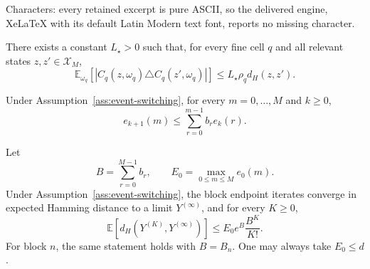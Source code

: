 \documentclass[10pt,a4paper]{amsart}
\begin{document}
Characters: every retained excerpt is pure ASCII, so the delivered engine, XeLaTeX with its default Latin Modern text font, reports no missing character.
\begin{assumption}
\label{ass:event-switching}
There exists a constant $L_\star>0$ such that, for every fine cell $q$ and all relevant states $z,z'\in\mathcal X_M$,
\[
\mathbb E_{\omega_q}\left[\left|C_q(z,\omega_q)\triangle C_q(z',\omega_q)\right|\right]
\le
L_\star\rho_q d_H(z,z').
\]
\end{assumption}

\begin{lemma}
\label{lem:triangular-recursion}
Under Assumption~\ref{ass:event-switching}, for every $m=0,\ldots,M$ and $k\ge0$,
\[
e_{k+1}(m)
\le
\sum_{r=0}^{m-1}b_r e_k(r).
\]
\end{lemma}

\begin{theorem}
\label{thm:picard-endpoint}
Let
\[
B=\sum_{r=0}^{M-1}b_r,
\qquad
E_0=\max_{0\le m\le M}e_0(m).
\]
Under Assumption~\ref{ass:event-switching}, the block endpoint iterates converge in expected Hamming distance to a limit $Y^{(\infty)}$, and for every $K\ge0$,
\[
\mathbb E\left[d_H\left(Y^{(K)},Y^{(\infty)}\right)\right]
\le
E_0 e^B\frac{B^K}{K!}.
\]
For block $n$, the same statement holds with $B=B_n$. One may always take $E_0\le d$.
\end{theorem}
\end{document}

